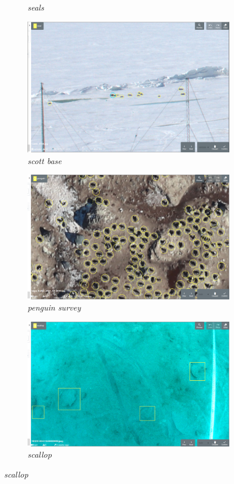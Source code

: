 \begin{figure}[h!]
\begin{subfigure}[t]{0.24\linewidth}
  \caption{\emph{seals}}
\end{subfigure}%
\begin{subfigure}[t]{0.24\linewidth}
  \includegraphics[width=1.0\linewidth]{figures/annotation/screenshots/scott_base_sunny.png}
  \caption{\emph{scott base}}
\end{subfigure}
\begin{subfigure}[t]{0.24\linewidth}
  \includegraphics[width=1.0\linewidth]{figures/annotation/screenshots/penguins_aerial2.png}
  \caption{\emph{penguin survey}}
\end{subfigure}%
\begin{subfigure}[t]{0.24\linewidth}
  \includegraphics[width=1.0\linewidth]{figures/annotation/screenshots/scallops4.png}
  \caption{\emph{scallop}}
\end{subfigure}
 

\end{figure}
